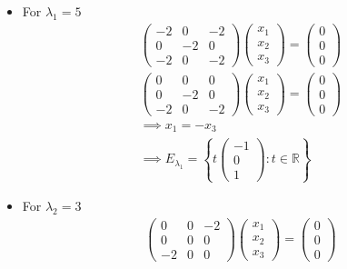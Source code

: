 \begin{itemize}
\item For $\lambda_1 = 5$
\begin{gather}
\begin{pmatrix}
-2  & 0  & -2\\
0  & -2  & 0\\
-2 & 0  & -2
\end{pmatrix}
\begin{pmatrix}
x_1\\x_2\\x_3
\end{pmatrix}
=
\begin{pmatrix}
0\\0\\0
\end{pmatrix}\\
\begin{pmatrix}
0 & 0 & 0\\
0  & -2  & 0\\
-2 & 0  & -2
\end{pmatrix}
\begin{pmatrix}
x_1\\x_2\\x_3
\end{pmatrix}
=
\begin{pmatrix}
0\\0\\0
\end{pmatrix}\\
\implies x_1 = -x_3\\
\implies E_{\lambda_1} = \left\{
t\begin{pmatrix}-1\\0\\1\end{pmatrix}\colon t \in \mathbb{R}
\right\}
\end{gather}
\item For $\lambda_2 = 3$
\begin{gather}
\begin{pmatrix}
0  & 0  & -2\\
0  & 0  & 0\\
-2 & 0  & 0
\end{pmatrix}
\begin{pmatrix}
x_1\\x_2\\x_3
\end{pmatrix}
=
\begin{pmatrix}
0\\0\\0

\end{pmatrix}
\end{gather}
\end{itemize}
